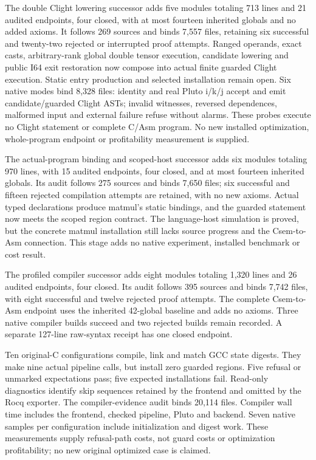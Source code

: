 The double Clight lowering successor adds five modules totaling 713 lines and
21 audited endpoints, four closed, with at most fourteen inherited globals
and no added axioms. It follows 269 sources and binds 7,557 files, retaining
six successful and twenty-two rejected or interrupted proof attempts. Ranged
operands, exact casts, arbitrary-rank global double tensor execution, candidate
lowering and public I64 exit restoration now compose into actual finite guarded
Clight execution. Static entry production and selected installation remain open.
Six native modes bind 8,328 files: identity and real Pluto i/k/j accept and emit
candidate/guarded Clight ASTs; invalid witnesses, reversed dependences, malformed
input and external failure refuse without alarms. These probes execute no
Clight statement or complete C/Asm program. No new installed optimization,
whole-program endpoint or profitability measurement is supplied.

The actual-program binding and scoped-host successor adds six modules totaling
970 lines, with 15 audited endpoints, four closed, and at most fourteen inherited
globals. Its audit follows 275 sources and binds 7,650 files; six successful and
fifteen rejected compilation attempts are retained, with no new axioms. Actual
typed declarations produce matmul's static bindings, and the guarded statement
now meets the scoped region contract. The language-host simulation is proved,
but the concrete matmul installation still lacks source progress and the
Csem-to-Asm connection. This stage adds no native experiment, installed
benchmark or cost result.

The profiled compiler successor adds eight modules totaling 1,320 lines and
26 audited endpoints, four closed. Its audit follows 395 sources and binds
7,742 files, with eight successful and twelve rejected proof attempts. The
complete Csem-to-Asm endpoint uses the inherited 42-global baseline and adds
no axioms. Three native compiler builds succeed and two rejected builds remain
recorded. A separate 127-line raw-syntax receipt has one closed endpoint.

Ten original-C configurations compile, link and match GCC state digests.
They make nine actual pipeline calls, but install zero guarded regions.
Five refusal or unmarked expectations pass; five expected installations fail.
Read-only diagnostics identify skip sequences retained by the frontend and
omitted by the Rocq exporter. The compiler-evidence audit binds 20,114 files.
Compiler wall time includes the frontend, checked pipeline, Pluto and backend.
Seven native samples per configuration include initialization and digest work.
These measurements supply refusal-path costs, not guard costs or optimization
profitability; no new original optimized case is claimed.

